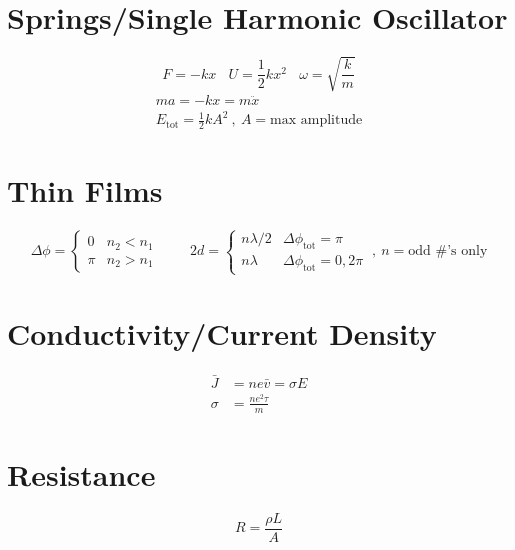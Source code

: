 \documentclass[10pt,letter]{article}
\begin{document}
\section{Springs/Single Harmonic Oscillator} %
\label{sec:springs_single_harmonic_oscillator}
\begin{equation}
    F = -kx~~~~ U = \frac{1}{2}kx^2 ~~~~ \omega = \sqrt{\frac{k}{m}}
\end{equation}
\begin{align}
    ma = -kx = m \ddot{x}\\
    E_{\textrm{tot}} = \frac{1}{2}kA^2~, ~A=\textrm{max amplitude}
\end{align}

\section{Thin Films} %
\label{sec:thin_films}
\[
 \Delta \phi =
  \begin{cases}
   0  & n_2<n_1 \\
   \pi &  n_2>n_1
  \end{cases}
  ~~~~~~~~~~
  2d =
  \begin{cases}
   n\lambda/2  & \Delta \phi_{\textrm{tot}} = \pi \\
   n\lambda &  \Delta \phi_{\textrm{tot}} = 0,2\pi
  \end{cases}~,~n=\textrm{odd \#'s only}
\]

\section{Conductivity/Current Density} %
\label{sec:conductivity_current_density}
\begin{align}
\bar{J} &= ne\bar{v} = \sigma E\\
\sigma &= \frac{ne^2\tau}{m}
\end{align}

\section{Resistance} %
\label{sec:resistance}
\begin{equation}
    R = \frac{\rho L}{A}
\end{equation}
\end{document}
